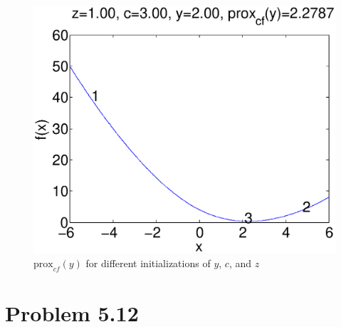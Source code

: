 \documentclass{scrartcl}
\begin{document}
\begin{figure}[H]
\begin{minipage}[b]{0.3\textwidth}
    \includegraphics[scale=0.26]{prob_8_y_2_c_3_z_1.eps}
  \end{minipage}
  \caption{$\text{prox}_{cf}(y)$ for different initializations of $y$, $c$, and $z$}
  \label{fig:prob8_result}
\end{figure}


\section*{Problem 5.12}
\end{document}
